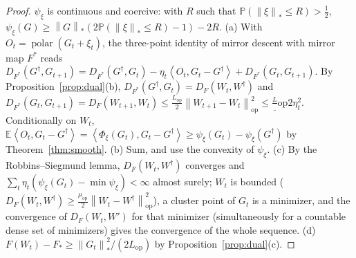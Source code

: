 \documentclass[11pt]{article}
\theoremstyle{definition}
\theoremstyle{remark}
\newcommand{\E}{\mathbb{E}}
\newcommand{\Prob}{\mathbb{P}}
\newcommand{\nop}[1]{\left\|#1\right\|_{\mathrm{op}}}
\newcommand{\nnuc}[1]{\left\|#1\right\|_{*}}
\newcommand{\inner}[2]{\left\langle #1, #2 \right\rangle}
\newcommand{\polar}{\operatorname{polar}}
\newcommand{\Lop}{L_{\mathrm{op}}}
\newcommand{\muop}{\mu_{\mathrm{op}}}
\begin{document}
\begin{proof}
$\psi_\xi$ is continuous and coercive: with $R$ such that $\Prob(\nnuc\xi\le R)>\frac12$,
$\psi_\xi(G)\ge\nnuc G(2\Prob(\nnuc\xi\le R)-1)-2R$. (a) With $O_t=\polar(G_t+\xi_t)$, the three-point identity of mirror
descent with mirror map $F^\ast$ reads
$D_{F^\ast}(G^\dagger,G_{t+1})=D_{F^\ast}(G^\dagger,G_t)-\eta_t\inner{O_t}{G_t-G^\dagger}+D_{F^\ast}(G_t,G_{t+1})$. By
Proposition~\ref{prop:dual}(b), $D_{F^\ast}(G^\dagger,G_t)=D_F(W_t,W^\dagger)$ and
$D_{F^\ast}(G_t,G_{t+1})=D_F(W_{t+1},W_t)\le\frac{\Lop}2\nop{W_{t+1}-W_t}^2\le\frac\Lop2\eta_t^2$. Conditionally on $W_t$,
$\E\inner{O_t}{G_t-G^\dagger}=\inner{\Phi_\xi(G_t)}{G_t-G^\dagger}\ge\psi_\xi(G_t)-\psi_\xi(G^\dagger)$ by
Theorem~\ref{thm:smooth}. (b) Sum, and use the convexity of $\psi_\xi$. (c) By the Robbins--Siegmund lemma,
$D_F(W_t,W^\dagger)$ converges and $\sum_t\eta_t(\psi_\xi(G_t)-\min\psi_\xi)<\infty$ almost surely; $W_t$ is bounded
($D_F(W_t,W^\dagger)\ge\frac{\muop}2\nop{W_t-W^\dagger}^2$), a cluster point of $G_t$ is a minimizer, and the convergence of
$D_F(W_t,W')$ for that minimizer (simultaneously for a countable dense set of minimizers) gives the convergence of the
whole sequence. (d) $F(W_t)-F_\ast\ge\nnuc{G_t}^2/(2\Lop)$ by Proposition~\ref{prop:dual}(c).
\end{proof}
\end{document}
